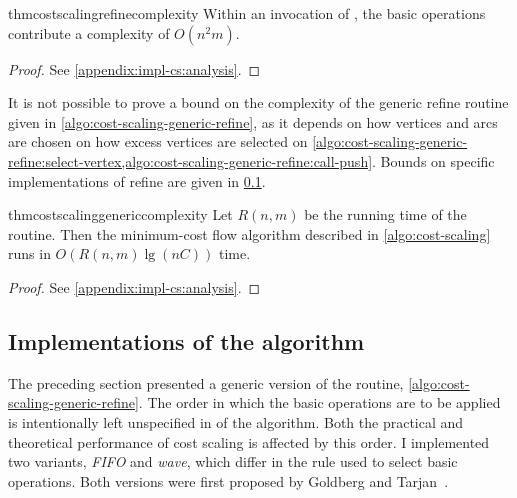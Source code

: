 \begin{restatable}{thm}{costscalingrefinecomplexity} \label{thm:cost-scaling-refine-complexity}
Within an invocation of , the basic operations contribute a complexity of $O(n^2m)$.
\end{restatable}
\begin{proof}
See \cref{appendix:impl-cs:analysis}.
\end{proof}

\begin{remark}
It is not possible to prove a bound on the complexity of the generic refine routine given in \cref{algo:cost-scaling-generic-refine}, as it depends on how vertices and arcs are chosen on how excess vertices are selected on \cref{algo:cost-scaling-generic-refine:select-vertex,algo:cost-scaling-generic-refine:call-push}. Bounds on specific implementations of refine are given in \cref{sec:impl-cost-scaling-implementations}.\\
\end{remark}

\begin{restatable}{thm}{costscalinggenericcomplexity} \label{lemma:cost-scaling-overall-algorithm}
Let $R(n,m)$ be the running time of the  routine. Then the minimum-cost flow algorithm described in \cref{algo:cost-scaling} runs in $O\left(R(n,m)\lg(nC)\right)$ time.
\end{restatable}
\begin{proof} 
See \cref{appendix:impl-cs:analysis}.
\end{proof}

\subsection{Implementations of the algorithm} \label{sec:impl-cost-scaling-implementations}

The preceding section presented a generic version of the  routine, \cref{algo:cost-scaling-generic-refine}. The order in which the basic operations are to be applied is intentionally left unspecified in  of the algorithm. Both the practical and theoretical performance of cost scaling is affected by this order. I implemented two variants, \textit{FIFO} and \textit{wave}, which differ in the rule used to select basic operations. Both versions were first proposed by Goldberg and Tarjan~\cite{Goldberg:1990}.

